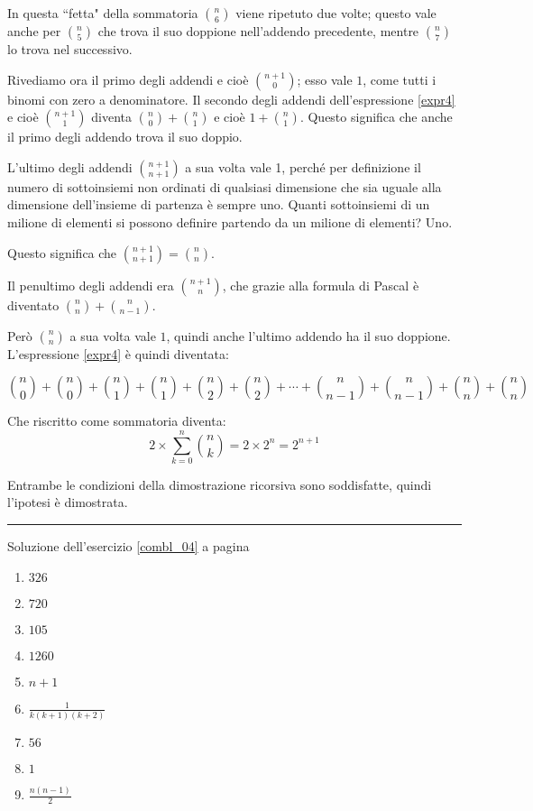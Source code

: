 In questa ``fetta" della sommatoria ${n\choose 6}$ viene ripetuto due volte; questo vale anche per ${n\choose 5}$ che trova il suo doppione nell'addendo precedente, mentre ${n \choose 7}$ lo trova nel successivo.

Rivediamo ora il primo degli addendi e cioè ${n+1 \choose 0}$; esso vale $1$, come tutti i binomi con zero a denominatore.
Il secondo degli addendi dell'espressione \ref{expr4} e cioè ${n+1\choose 1}$ diventa ${n\choose 0}+{n\choose 1}$ e cioè $1+{n\choose 1}$.  Questo significa che anche il primo degli addendo trova il suo doppio.

L'ultimo degli addendi ${n+1\choose n+1}$ a sua volta vale 1, perché per definizione il numero di sottoinsiemi non ordinati di qualsiasi dimensione che sia uguale alla dimensione dell'insieme di partenza è sempre uno.  Quanti sottoinsiemi di un milione di elementi si possono definire partendo da un milione di elementi?  Uno.

Questo significa che ${n+1\choose n+1}={n\choose n}$.

Il penultimo degli addendi era ${n+1\choose n}$, che grazie alla formula di Pascal è diventato ${n\choose n}+{n\choose n-1}$.

Però ${n\choose n}$ a sua volta vale $1$, quindi anche l'ultimo addendo ha il suo doppione.  L'espressione \ref{expr4} è quindi diventata:

\begin{equation*}
{n\choose 0}+{n\choose 0}+
{n\choose 1}+{n\choose 1}+
{n\choose 2}+{n\choose 2}+\cdots+
{n\choose n-1}+{n\choose n-1}+
{n\choose n}+{n\choose n}
\end{equation*}

Che riscritto come sommatoria diventa:
\begin{equation*}
2\times\sum_{k=0}^n{{n\choose k}} = 2\times2^n=2^{n+1}
\end{equation*}

Entrambe le condizioni della dimostrazione ricorsiva sono soddisfatte, quindi l'ipotesi è dimostrata.

\vspace{1cm}
\hrule
\vspace{1cm}

Soluzione dell'esercizio \ref{combl_04} a pagina \pageref{combl_04}\label{combs_04}

\begin{enumerate}[label=(\alph*)]
\item $326$
\item $720$
\item $105$
\item $1260$
\item $n+1$
\item $\frac{1}{k(k+1)(k+2)}$
\item $56$
\item $1$
\item $\frac{n(n-1)}{2}$
\end{enumerate}

